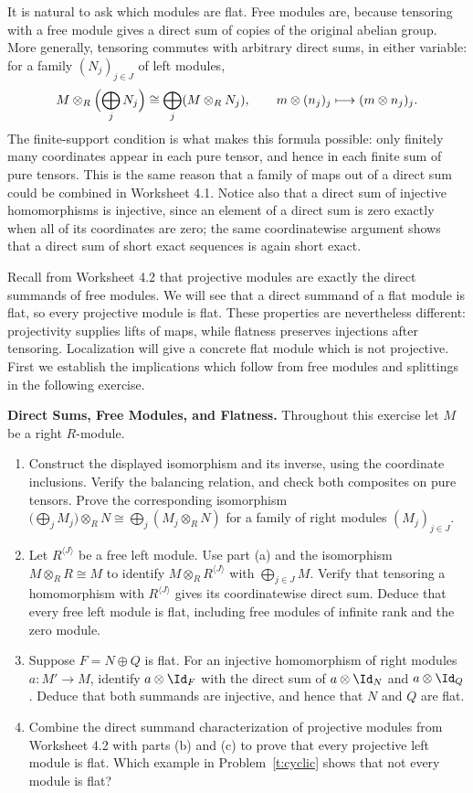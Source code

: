 \documentclass[12pt,reqno]{amsart}
\begin{document}
It is natural to ask which modules are flat. Free modules are, because tensoring with a free module gives a direct sum of copies of the original abelian group. More generally, tensoring commutes with arbitrary direct sums, in either variable: for a family $(N_j)_{j\in J}$ of left modules,
\[
M\otimes_R\Bigl(\bigoplus_jN_j\Bigr)\cong\bigoplus_j(M\otimes_RN_j),\qquad m\otimes(n_j)_j\longmapsto(m\otimes n_j)_j.
\]
The finite-support condition is what makes this formula possible: only finitely many coordinates appear in each pure tensor, and hence in each finite sum of pure tensors. This is the same reason that a family of maps out of a direct sum could be combined in Worksheet 4.1. Notice also that a direct sum of injective homomorphisms is injective, since an element of a direct sum is zero exactly when all of its coordinates are zero; the same coordinatewise argument shows that a direct sum of short exact sequences is again short exact.

Recall from Worksheet 4.2 that projective modules are exactly the direct summands of free modules. We will see that a direct summand of a flat module is flat, so every projective module is flat. These properties are nevertheless different: projectivity supplies lifts of maps, while flatness preserves injections after tensoring. Localization will give a concrete flat module which is not projective. First we establish the implications which follow from free modules and splittings in the following exercise.

\hrulefill

\begin{problems}
\item\label{t:flat} \textbf{Direct Sums, Free Modules, and Flatness.} Throughout this exercise let $M$ be a right $R$-module.
\begin{enumerate}
\item Construct the displayed isomorphism and its inverse, using the coordinate inclusions. Verify the balancing relation, and check both composites on pure tensors. Prove the corresponding isomorphism $\bigl(\bigoplus_jM_j\bigr)\otimes_RN\cong\bigoplus_j(M_j\otimes_RN)$ for a family of right modules $(M_j)_{j\in J}$.
\item Let $R^{\langle J\rangle}$ be a free left module. Use part (a) and the isomorphism $M\otimes_RR\cong M$ to identify $M\otimes_RR^{\langle J\rangle}$ with $\bigoplus_{j\in J}M$. Verify that tensoring a homomorphism with $R^{\langle J\rangle}$ gives its coordinatewise direct sum. Deduce that every free left module is flat, including free modules of infinite rank and the zero module.
\item Suppose $F=N\oplus Q$ is flat. For an injective homomorphism of right modules $a:M'\to M$, identify $a\otimes\Id_F$ with the direct sum of $a\otimes\Id_N$ and $a\otimes\Id_Q$. Deduce that both summands are injective, and hence that $N$ and $Q$ are flat.
\item Combine the direct summand characterization of projective modules from Worksheet 4.2 with parts (b) and (c) to prove that every projective left module is flat. Which example in Problem~\ref{t:cyclic} shows that not every module is flat?
\end{enumerate}
\end{problems}
\end{document}
